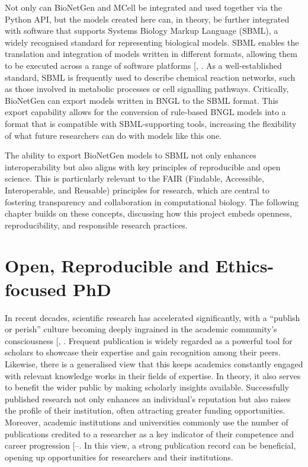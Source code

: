 \documentclass[
  11pt,
  letterpaper,
]{scrreprt}
\begin{document}
Not only can BioNetGen and MCell be integrated and used together via the
Python API, but the models created here can, in theory, be further
integrated with software that supports Systems Biology Markup Language
(SBML), a widely recognised standard for representing biological models.
SBML enables the translation and integration of models written in
different formats, allowing them to be executed across a range of
software platforms {[},
\citeproc{ref-keating2020SBML}{302}{]}. As a well-established standard,
SBML is frequently used to describe chemical reaction networks, such as
those involved in metabolic processes or cell signalling pathways.
Critically, BioNetGen can export models written in BNGL to the SBML
format. This export capability allows for the conversion of rule-based
BNGL models into a format that is compatible with SBML-supporting tools,
increasing the flexibility of what future researchers can do with models
like this one.

The ability to export BioNetGen models to SBML not only enhances
interoperability but also aligns with key principles of reproducible and
open science. This is particularly relevant to the FAIR (Findable,
Accessible, Interoperable, and Reusable) principles for research, which
are central to fostering transparency and collaboration in computational
biology. The following chapter builds on these concepts, discussing how
this project embeds openness, reproducibility, and responsible research
practices.


\chapter{Open, Reproducible and Ethics-focused
PhD}\label{sec-open-repro-chapter}

In recent decades, scientific research has accelerated significantly,
with a ``publish or perish'' culture becoming deeply ingrained in the
academic community's consciousness
{[},
\citeproc{ref-rawat2014Publish}{304}{]}. Frequent publication is widely
regarded as a powerful tool for scholars to showcase their expertise and
gain recognition among their peers. Likewise, there is a generalised
view that this keeps academics constantly engaged with relevant
knowledge works in their fields of expertise. In theory, it also serves
to benefit the wider public by making scholarly insights available.
Successfully published research not only enhances an individual's
reputation but also raises the profile of their institution, often
attracting greater funding opportunities. Moreover, academic
institutions and universities commonly use the number of publications
credited to a researcher as a key indicator of their competence and
career progression
{[}--\citeproc{ref-elbanna2023Publish}{307}{]}.
In this view, a strong publication record can be beneficial, opening up
opportunities for researchers and their institutions.
\end{document}

